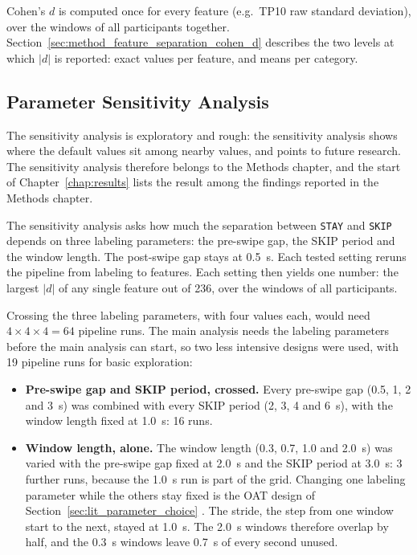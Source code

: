 \documentclass[12pt,a4paper]{report}
\begin{document}
Cohen's \(d\) is computed once for every feature (e.g.\ TP10 raw standard deviation), over the windows of all participants together. Section~\ref{sec:method_feature_separation_cohen_d} describes the two levels at which \(|d|\) is reported: exact values per feature, and means per category.

\subsection{Parameter Sensitivity Analysis}
\label{sec:method_parameter_sensitivity}
The sensitivity analysis is exploratory and rough: the sensitivity analysis shows where the default values sit among nearby values, and points to future research. The sensitivity analysis therefore belongs to the Methods chapter, and the start of Chapter~\ref{chap:results} lists the result among the findings reported in the Methods chapter.

The sensitivity analysis asks how much the separation between \texttt{STAY} and \texttt{SKIP} depends on three labeling parameters: the pre-swipe gap, the SKIP period and the window length. The post-swipe gap stays at 0.5~s. Each tested setting reruns the pipeline from labeling to features. Each setting then yields one number: the largest \(|d|\) of any single feature out of 236, over the windows of all participants.

Crossing the three labeling parameters, with four values each, would need \(4 \times 4 \times 4 = 64\) pipeline runs. The main analysis needs the labeling parameters before the main analysis can start, so two less intensive designs were used, with 19 pipeline runs for basic exploration:
\begin{itemize}
    \item \textbf{Pre-swipe gap and SKIP period, crossed.} Every pre-swipe gap (0.5, 1, 2 and 3~s) was combined with every SKIP period (2, 3, 4 and 6~s), with the window length fixed at 1.0~s: 16 runs.
    \item \textbf{Window length, alone.} The window length (0.3, 0.7, 1.0 and 2.0~s) was varied with the pre-swipe gap fixed at 2.0~s and the SKIP period at 3.0~s: 3 further runs, because the 1.0~s run is part of the grid. Changing one labeling parameter while the others stay fixed is the OAT design of Section~\ref{sec:lit_parameter_choice} \cite{saltelli_global_2008}. The stride, the step from one window start to the next, stayed at 1.0~s. The 2.0~s windows therefore overlap by half, and the 0.3~s windows leave 0.7~s of every second unused.
\end{itemize}
\end{document}
